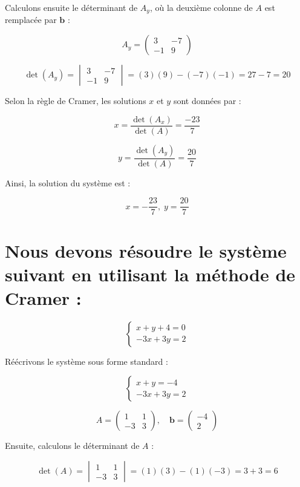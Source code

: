 \documentclass[12pt]{article}
\begin{document}
Calculons ensuite le déterminant de $A_y$, où la deuxième colonne de $A$ est remplacée par $\mathbf{b}$ :

\[
A_y = \begin{pmatrix}
3 & -7 \\
-1 & 9
\end{pmatrix}
\]

\[
\det(A_y) = \begin{vmatrix}
3 & -7 \\
-1 & 9
\end{vmatrix} = (3)(9) - (-7)(-1) = 27 - 7 = 20
\]

Selon la règle de Cramer, les solutions $x$ et $y$ sont données par :

\[
x = \frac{\det(A_x)}{\det(A)} = \frac{-23}{7}
\]

\[
y = \frac{\det(A_y)}{\det(A)} = \frac{20}{7}
\]

Ainsi, la solution du système est :

\[
\boxed{x = -\frac{23}{7}, \; y = \frac{20}{7}}
\]

\section*{Nous devons résoudre le système suivant en utilisant la méthode de Cramer :}

\[
\begin{cases}
x + y + 4 = 0 \\
-3x + 3y = 2
\end{cases}
\]

Réécrivons le système sous forme standard :

\[
\begin{cases}
x + y = -4 \\
-3x + 3y = 2
\end{cases}
\]

\[
A = \begin{pmatrix}
1 & 1 \\
-3 & 3
\end{pmatrix}, \quad
\mathbf{b} = \begin{pmatrix}
-4 \\
2
\end{pmatrix}
\]

Ensuite, calculons le déterminant de $A$ :

\[
\det(A) = \begin{vmatrix}
1 & 1 \\
-3 & 3
\end{vmatrix} = (1)(3) - (1)(-3) = 3 + 3 = 6
\]
\end{document}

